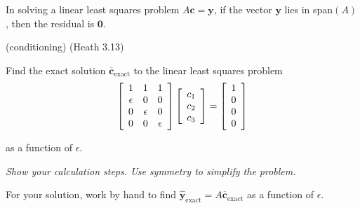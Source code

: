 \documentclass[12pt,letterpaper,noanswers]{exam}
\begin{document}
\begin{questions}
\begin{parts}
In solving a linear least squares problem $A\mathbf{c} = \mathbf{y}$, if the vector $\mathbf{y}$ lies in span$(A)$, then the residual is $\mathbf{0}$.











\end{parts}

\question (conditioning) (Heath 3.13)

\begin{parts}
\item 
Find the exact solution $\overline{\mathbf{c}}_\text{exact}$ to the linear least squares problem 
\[\left[\begin{array}{c c c} 
1 & 1& 1\\
\epsilon & 0 & 0 \\
 0 & \epsilon &0 \\
 0 & 0 & \epsilon \\
\end{array}\right]
\left[\begin{array}{c} 
c_1 \\ c_2 \\ c_3
\end{array}\right] = \left[\begin{array}{c} 
1 \\ 0 \\ 0 \\ 0
\end{array}\right]\]

as a function of $\epsilon$.

\emph{Show your calculation steps.  Use symmetry to simplify the problem.}

\item For your solution, work by hand to find $\hat{\mathbf{y}}_{\text{exact}} = A\overline{\mathbf{c}}_\text{exact}$ as a function of $\epsilon$.


\end{parts}
\end{questions}
\end{document}
